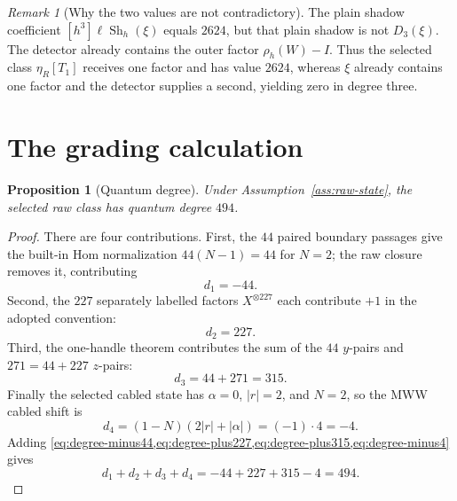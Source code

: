 \documentclass[10pt,reqno]{amsart}
\newtheorem{proposition}[theorem]{Proposition}
\theoremstyle{definition}
\theoremstyle{remark}
\newtheorem{remark}[theorem]{Remark}
\newcommand{\Sh}{\operatorname{Sh}}
\begin{document}
\begin{remark}[Why the two values are not contradictory]\label{rem:vT-xi}
The plain shadow coefficient $[h^3]\ell\Sh_h(\xi)$ equals $2624$, but that
plain shadow is not $D_3(\xi)$.  The detector already contains the outer
factor $\rho_h(W)-I$.  Thus the selected class $\eta_R[T_1]$ receives one
factor and has value $2624$, whereas $\xi$ already contains one factor and
the detector supplies a second, yielding zero in degree three.
\end{remark}

\section{The grading calculation}\label{sec:grading}

\begin{proposition}[Quantum degree]\label{prop:degree-494}
Under Assumption~\ref{ass:raw-state}, the selected raw class has quantum
degree $494$.
\end{proposition}

\begin{proof}
There are four contributions.  First, the $44$ paired boundary passages give
the built-in Hom normalization $44(N-1)=44$ for $N=2$; the raw closure removes
it, contributing
\begin{equation}\label{eq:degree-minus44}
d_1=-44.
\end{equation}
Second, the $227$ separately labelled factors $X^{\otimes227}$ each contribute
$+1$ in the adopted convention:
\begin{equation}\label{eq:degree-plus227}
d_2=227.
\end{equation}
Third, the one-handle theorem contributes the sum of the $44$ $y$-pairs and
$271=44+227$ $z$-pairs:
\begin{equation}\label{eq:degree-plus315}
d_3=44+271=315.
\end{equation}
Finally the selected cabled state has $\alpha=0$, $|r|=2$, and $N=2$, so the
MWW cabled shift is
\begin{equation}\label{eq:degree-minus4}
d_4=(1-N)(2|r|+|\alpha|)=(-1)\cdot4=-4.
\end{equation}
Adding \cref{eq:degree-minus44,eq:degree-plus227,eq:degree-plus315,eq:degree-minus4}
gives
\begin{equation}\label{eq:degree-total}
d_1+d_2+d_3+d_4=-44+227+315-4=494.
\end{equation}
\end{proof}
\end{document}
